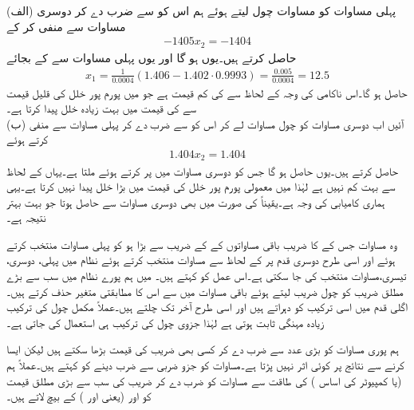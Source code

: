 (الف)  پہلی مساوات کو مساوات چول لیتے ہوئے ہم اس کو  سے ضرب دے کر دوسری مساوات سے منفی کر کے
\begin{align*}
-1405x_2=-1404
\end{align*}
حاصل کرتے ہیں۔یوں  ہو گا اور یوں پہلی مساوات سے  کے بجائے 
\begin{align*}
x_1=\frac{1}{0.0004}(1.406-1.402\cdot 0.9993)=\frac{0.005}{0.0004}=12.5
\end{align*}
حاصل ہو گا۔اس ناکامی کی وجہ  کے لحاظ سے   کی کم قیمت ہے جو  میں پورم پور خلل کی قلیل قیمت سے  کی قیمت میں بہت زیادہ خلل پیدا کرتا ہے۔\\
(ب) آئیں اب دوسری مساوات کو چول مساوات لے کر اس کو  سے ضرب دے کر پہلی مساوات سے منفی کرتے ہوئے
\begin{align*}
1.404x_2=1.404
\end{align*}
حاصل کرتے ہیں۔یوں  حاصل ہو گا جس کو دوسری مساوات میں پر کرتے ہوئے  ملتا ہے۔یہاں  کے لحاظ سے  بہت کم نہیں ہے لہٰذا  میں معمولی پورم پور خلل  کی قیمت میں بڑا خلل پیدا نہیں کرتا ہے۔یہی ہماری کامیابی کی  وجہ ہے۔یقیناً  کی صورت میں بھی دوسری مساوات سے  حاصل ہوتا جو بہت بہتر نتیجہ  ہے۔

وہ مساوات جس کے  کا  ضریب  باقی مساواتوں کے  کے  ضریب  سے بڑا ہو کو پہلی مساوات منتخب کرتے ہوئے اور اسی طرح دوسری قدم پر  کے لحاظ سے مساوات منتخب کرتے ہوئے نظام میں پہلی، دوسری، تیسری، مساوات منتخب کی جا سکتی ہے۔اس عمل کو  کہتے ہیں۔  میں ہم  پورے نظام میں سب سے بڑے مطلق  ضریب  کو چول  ضریب  لیتے ہوئے باقی مساوات میں سے اس کا مطابقتی متغیر حذف کرتے ہیں۔اگلی قدم میں اسی ترکیب کو دہراتے ہیں اور اسی طرح آخر تک چلتے ہیں۔عملاً مکمل چول کی ترکیب زیادہ مہنگی ثابت ہوتی ہے لہٰذا جزوی چول کی ترکیب ہی استعمال کی جاتی ہے۔

ہم پوری مساوات کو بڑی عدد سے ضرب دے کر کسی بھی  ضریب  کی قیمت بڑھا سکتے ہیں لیکن ایسا کرنے سے نتائج پر کوئی اثر نہیں پڑتا ہے۔مساوات کو جزو ضربی سے ضرب دینے کو   کہتے ہیں۔عملاً ہم  (یا کمپیوٹر کی اساس ) کی طاقت سے مساوات کو ضرب دے کر  ضریب  کی سب سے بڑی مطلق قیمت کو  اور  (یعنی  اور ) کے بیچ لاتے ہیں۔

